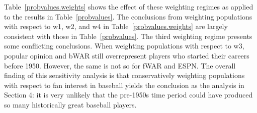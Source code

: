 \documentclass[11pt]{article}\usepackage[]{graphicx}\usepackage[]{color}
\begin{document}
Table~\ref{probvalues.weights} shows the effect of these weighting regimes as 
applied to the results in Table~\ref{probvalues}.  
The conclusions from weighting populations with respect to w1, w2, and w4 in 
Table~\ref{probvalues.weights} are largely consistent with those in 
Table~\ref{probvalues}.  %
The third weighting regime presents some conflicting conclusions.  When 
weighting populations with respect to w3, popular opinion and 
bWAR still overrepresent players who started their careers before 1950.  
However, the same is not so for fWAR and ESPN. 
The overall finding of this sensitivity analysis is that conservatively 
weighting populations with respect to fan interest in baseball yields the 
conclusion as the analysis in Section 4:
it is very unlikely that the pre-1950s time period could 
have produced so many historically great baseball players.  






\end{document}
